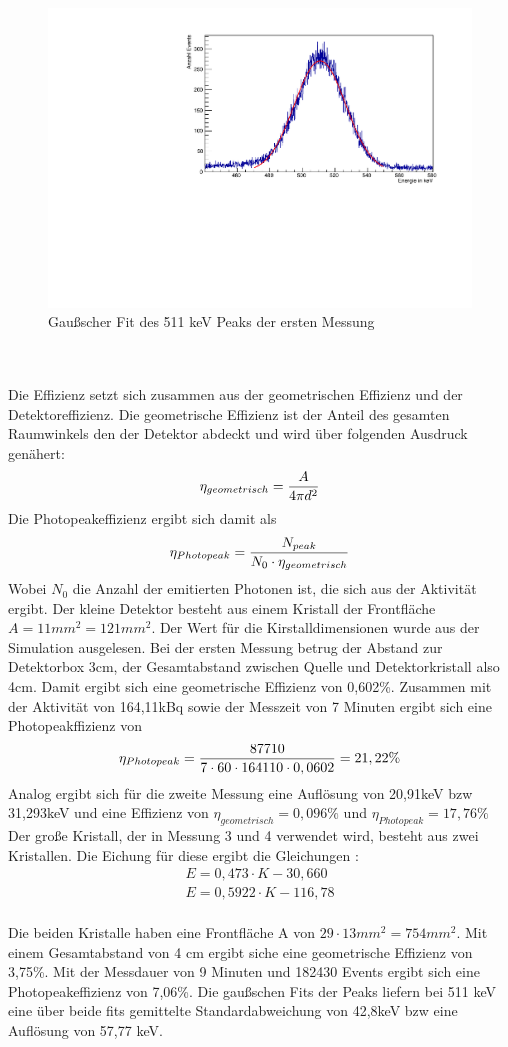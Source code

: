 \documentclass[a4paper,11pt,twoside]{article}
\begin{document}
\begin{figure}[H]
	\begin{center}
	\includegraphics[width=0.7\linewidth]{Fit1.pdf}
	\caption{Gaußscher Fit des 511 keV Peaks der ersten Messung}
	\label{l2}
	\end{center}
\end{figure}
\ \\
\ \\
Die Effizienz setzt sich zusammen aus der geometrischen Effizienz und der Detektoreffizienz. Die geometrische Effizienz ist der Anteil des gesamten Raumwinkels den der Detektor abdeckt und wird über folgenden Ausdruck genähert:
\begin{equation}
\eta_{geometrisch}={A\over 4 \pi d^2}
\end{equation}
Die Photopeakeffizienz ergibt sich damit als
\begin{equation}
\eta_{Photopeak}={N_{peak}\over N_0\cdot\eta_{geometrisch}}
\end{equation}
Wobei $N_0$ die Anzahl der emitierten Photonen ist, die sich aus der Aktivität ergibt. Der kleine Detektor besteht aus einem Kristall der Frontfläche $A=11mm^2=121mm^2$. Der Wert für die Kirstalldimensionen wurde aus der Simulation ausgelesen. Bei der ersten Messung betrug der Abstand zur Detektorbox 3cm, der Gesamtabstand zwischen Quelle und Detektorkristall also 4cm. Damit ergibt sich eine geometrische Effizienz von 0,602\%. Zusammen mit der Aktivität von 164,11kBq sowie der Messzeit von 7 Minuten ergibt sich eine Photopeakffizienz von
\begin{equation}
\eta_{Photopeak}={87710\over 7\cdot60\cdot164110\cdot0,0602}=21,22\%
\end{equation}
Analog ergibt sich für die zweite Messung eine Auflösung von 20,91keV bzw 31,293keV und eine Effizienz von $\eta_{geometrisch}=0,096\%$ und $\eta_{Photopeak}=17,76\%$
Der große Kristall, der in Messung 3 und 4 verwendet wird, besteht aus zwei Kristallen. Die Eichung für diese ergibt die Gleichungen :
\begin {align}
E=0,473\cdot K-30,660\\
E=0,5922\cdot K-116,78
\end{align}
\\
Die beiden Kristalle haben eine Frontfläche A von $29 \cdot 13 mm^2=754mm^2$. Mit einem Gesamtabstand von 4 cm ergibt siche eine geometrische Effizienz von 3,75\%. Mit der Messdauer von 9 Minuten und 182430 Events ergibt sich eine Photopeakeffizienz von 7,06\%.
Die gaußschen Fits der Peaks liefern bei 511 keV eine über beide fits gemittelte Standardabweichung von 42,8keV bzw eine Auflösung von 57,77 keV.
\end{document}
